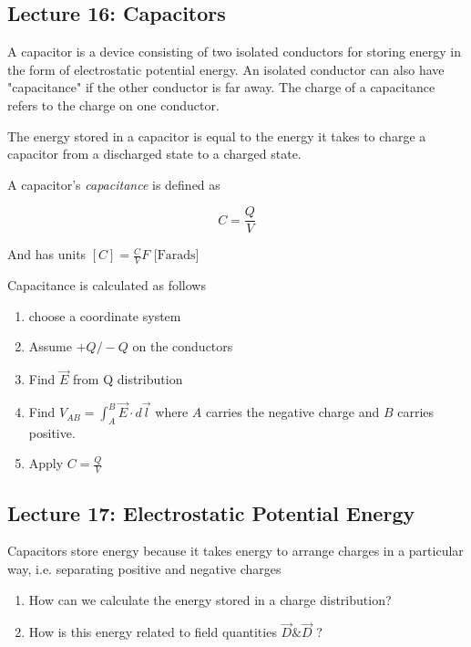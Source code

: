 \documentclass[10pt]{article}
\begin{document}
\subsection{Lecture 16: Capacitors}
\begin{definition}
A capacitor is a device consisting of two isolated conductors for storing energy in the form of electrostatic potential energy.
An isolated conductor can also have "capacitance" if the other conductor is far away. The charge of a capacitance refers to the charge on one conductor.

The energy stored in a capacitor is equal to the energy it takes to charge a capacitor from a discharged state to a charged state.

A capacitor's \textit{capacitance}  is defined as

\begin{equation}
	C = \frac{Q}{V}
	\label{eq:259:capacitance}
\end{equation}

And has units $ [C] = \frac{C}{V}  F \text{  [Farads]} $

\end{definition}


Capacitance is calculated as follows
\begin{enumerate}
	\item choose a coordinate system
	\item Assume $ +Q / - Q$ on the conductors
	\item Find $ \vec{E} $  from Q distribution
	\item Find $ V_{AB} = \int^B_A \vec{E} \cdot d \vec{l} $ where $ A  $ carries the negative charge and $ B  $ carries positive.
	\item Apply $ C = \frac{Q}{V}$ 
\end{enumerate}




\subsection{Lecture 17: Electrostatic Potential Energy}

\begin{remark}
	Capacitors store energy because it takes energy to arrange charges in a particular way, i.e. separating positive and negative charges
	\begin{enumerate}
		\item How can we calculate the energy stored in a charge distribution?
		\item How is this energy related to field quantities $ \vec{D} \& \vec{D} $ ?
	\end{enumerate}
\end{remark}
\end{document}
